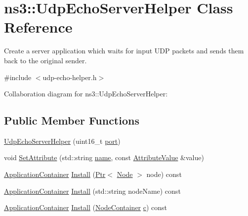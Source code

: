 \hypertarget{classns3_1_1UdpEchoServerHelper}{}\section{ns3\+:\+:Udp\+Echo\+Server\+Helper Class Reference}
\label{classns3_1_1UdpEchoServerHelper}


Create a server application which waits for input U\+DP packets and sends them back to the original sender.  




{\ttfamily \#include $<$udp-\/echo-\/helper.\+h$>$}



Collaboration diagram for ns3\+:\+:Udp\+Echo\+Server\+Helper\+:
\subsection*{Public Member Functions}
\begin{DoxyCompactItemize}
\item 
\hyperlink{classns3_1_1UdpEchoServerHelper_a10254b1b736d953343958528a88a3d92}{Udp\+Echo\+Server\+Helper} (uint16\+\_\+t \hyperlink{visualizer-ideas_8txt_a21ff1c530daf8435e00048b7fc2c58e3}{port})
\item 
void \hyperlink{classns3_1_1UdpEchoServerHelper_af5968cdc9042be2e89e2aea4e886368a}{Set\+Attribute} (std\+::string \hyperlink{generate__test__data__lte__spectrum__model_8m_ab74e6bf80237ddc4109968cedc58c151}{name}, const \hyperlink{classns3_1_1AttributeValue}{Attribute\+Value} \&value)
\item 
\hyperlink{classns3_1_1ApplicationContainer}{Application\+Container} \hyperlink{classns3_1_1UdpEchoServerHelper_aad381d52905f3f4cb0fc3cb7cb3f660b}{Install} (\hyperlink{classns3_1_1Ptr}{Ptr}$<$ \hyperlink{classns3_1_1Node}{Node} $>$ node) const 
\item 
\hyperlink{classns3_1_1ApplicationContainer}{Application\+Container} \hyperlink{classns3_1_1UdpEchoServerHelper_ad600efcc2b72cd7863fd25c2f4a062f3}{Install} (std\+::string node\+Name) const 
\item 
\hyperlink{classns3_1_1ApplicationContainer}{Application\+Container} \hyperlink{classns3_1_1UdpEchoServerHelper_a870da51507c89f2b9e45d39a19212027}{Install} (\hyperlink{classns3_1_1NodeContainer}{Node\+Container} \hyperlink{mmwave_2model_2fading-traces_2fading__trace__generator_8m_ae0323a9039add2978bf5b49550572c7c}{c}) const 
\end{DoxyCompactItemize}
